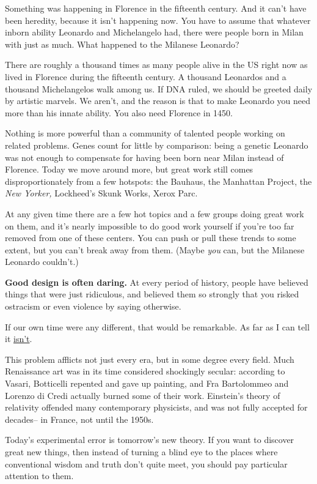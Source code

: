 \documentclass[12pt]{book}
\begin{document}
Something was happening in Florence in the fifteenth century. And it
can't have been heredity, because it isn't happening now. You have to
assume that whatever inborn ability Leonardo and Michelangelo had, there
were people born in Milan with just as much. What happened to the
Milanese Leonardo?

There are roughly a thousand times as many people alive in the US right
now as lived in Florence during the fifteenth century. A thousand
Leonardos and a thousand Michelangelos walk among us. If DNA ruled, we
should be greeted daily by artistic marvels. We aren't, and the reason
is that to make Leonardo you need more than his innate ability. You also
need Florence in 1450.

Nothing is more powerful than a community of talented people working on
related problems. Genes count for little by comparison: being a genetic
Leonardo was not enough to compensate for having been born near Milan
instead of Florence. Today we move around more, but great work still
comes disproportionately from a few hotspots: the Bauhaus, the Manhattan
Project, the \emph{New Yorker,} Lockheed's Skunk Works, Xerox Parc.

At any given time there are a few hot topics and a few groups doing
great work on them, and it's nearly impossible to do good work yourself
if you're too far removed from one of these centers. You can push or
pull these trends to some extent, but you can't break away from them.
(Maybe \emph{you} can, but the Milanese Leonardo couldn't.)

\textbf{Good design is often daring.} At every period of history, people
have believed things that were just ridiculous, and believed them so
strongly that you risked ostracism or even violence by saying otherwise.

If our own time were any different, that would be remarkable. As far as
I can tell it \href{say.html}{isn't}.

This problem afflicts not just every era, but in some degree every
field. Much Renaissance art was in its time considered shockingly
secular: according to Vasari, Botticelli repented and gave up painting,
and Fra Bartolommeo and Lorenzo di Credi actually burned some of their
work. Einstein's theory of relativity offended many contemporary
physicists, and was not fully accepted for decades-- in France, not
until the 1950s.

Today's experimental error is tomorrow's new theory. If you want to
discover great new things, then instead of turning a blind eye to the
places where conventional wisdom and truth don't quite meet, you should
pay particular attention to them.
\end{document}
